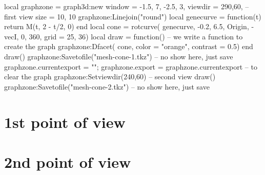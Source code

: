 \documentclass[varwidth, border = 3pt]{standalone}%
\begin{document}
\begin{luadraw}{}
    local graphzone = graph3d:new{
        window  = {-1.5, 7, -2.5, 3},
        viewdir = {290,60},  -- first view
        size    = {10, 10}
    }
    graphzone:Linejoin("round")
    local genecurve = function(t)
        return M(t, 2 - t/2, 0)
    end
    local cone = rotcurve(
        genecurve, -0.2, 6.5,
        {Origin, -vecI},
        0, 360,
        {grid = {25, 36}})
    local draw = function() -- we write a function to create the graph
        graphzone:Dfacet(
            cone,
            {color    = "orange",
            contrast = 0.5})
    end
    draw()
    graphzone:Savetofile("mesh-cone-1.tkz") -- no show here, just save
    graphzone.currentexport = {""}; graphzone.export = graphzone.currentexport -- to clear the graph
    graphzone:Setviewdir(240,60) -- second view
    draw()
    graphzone:Savetofile("mesh-cone-2.tkz") -- no show here, just save
\end{luadraw}    

\section*{1st point of view}
%
\section*{2nd point of view}
%
\end{document}
